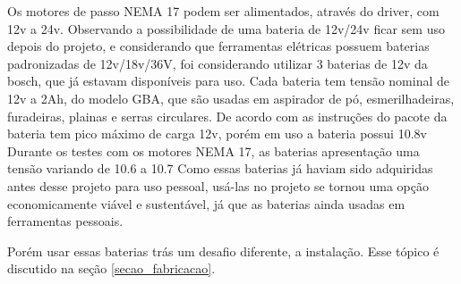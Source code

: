 Os motores de passo NEMA 17 podem ser alimentados, através do driver, com 12v a 24v.
Observando a possibilidade de uma bateria de 12v/24v ficar sem uso depois do projeto,
e considerando que ferramentas elétricas possuem baterias padronizadas de 12v/18v/36V, 
foi considerando utilizar 3 baterias de 12v da bosch, que já estavam disponíveis para uso.
Cada bateria tem tensão nominal de 12v a 2Ah, do modelo GBA, 
que são usadas em aspirador de pó, esmerilhadeiras, furadeiras, plainas e serras circulares.
De acordo com as instruções do pacote da bateria tem pico máximo de carga 12v, porém em uso a bateria possui 10.8v
Durante os testes com os motores NEMA 17,  as baterias apresentação uma tensão variando de 10.6 a 10.7
Como essas baterias já haviam sido adquiridas antes desse projeto para uso pessoal,
usá-las no projeto se tornou uma opção economicamente viável e sustentável,
já que as baterias ainda usadas em ferramentas pessoais.

Porém usar essas baterias trás um desafio diferente, a instalação.  Esse tópico é discutido na seção \ref{secao_fabricacao}.




